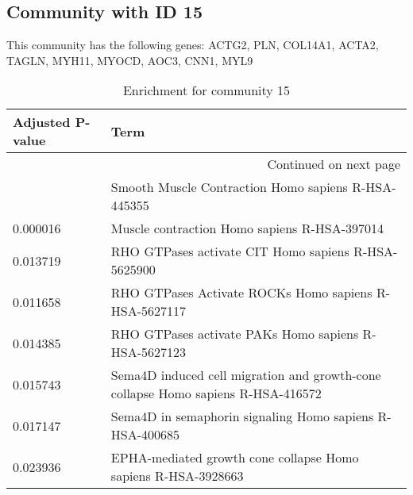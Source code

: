 \subsection*{Community with ID 15}
This community has the following genes: ACTG2, PLN, COL14A1, ACTA2, TAGLN, MYH11, MYOCD, AOC3, CNN1, MYL9
\\
\begin{longtable}{p{2.4cm}p{14.5cm}}
\caption{Enrichment for community 15}\\
\toprule
Adjusted \newline P-value &                                                                              Term \\
\midrule
\endhead
\midrule
\multicolumn{2}{r}{{Continued on next page}} \\
\midrule
\endfoot

\bottomrule
\endlastfoot
                 0.000002 &                               Smooth Muscle Contraction Homo sapiens R-HSA-445355 \\
                 0.000016 &                                      Muscle contraction Homo sapiens R-HSA-397014 \\
                 0.013719 &                               RHO GTPases activate CIT Homo sapiens R-HSA-5625900 \\
                 0.011658 &                             RHO GTPases Activate ROCKs Homo sapiens R-HSA-5627117 \\
                 0.014385 &                              RHO GTPases activate PAKs Homo sapiens R-HSA-5627123 \\
                 0.015743 &  Sema4D induced cell migration and growth-cone collapse Homo sapiens R-HSA-416572 \\
                 0.017147 &                          Sema4D in semaphorin signaling Homo sapiens R-HSA-400685 \\
                 0.023936 &                     EPHA-mediated growth cone collapse Homo sapiens R-HSA-3928663 \\
\end{longtable}


